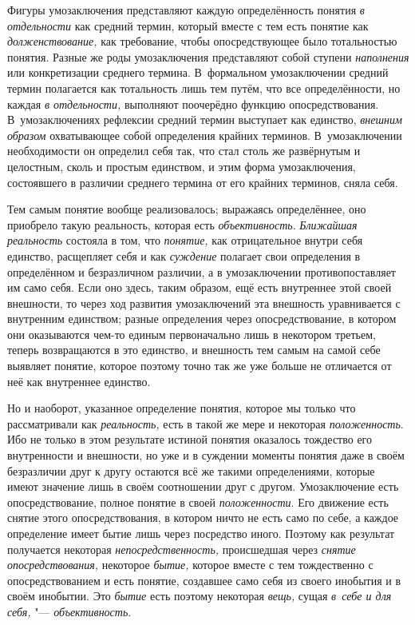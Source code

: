 Фигуры умозаключения представляют каждую определённость
понятия {\em в отдельности}
как средний термин, который вместе с тем есть понятие как
{\em долженствование,}
как требование, чтобы опосредствующее было тотальностью
понятия. Разные же роды умозаключения представляют собой ступени
{\em наполнения} или
конкретизации среднего термина. В~формальном умозаключении средний термин
полагается как тотальность лишь тем путём, что все определённости, но
каждая {\em в отдельности,}
выполняют поочерёдно функцию опосредствования.
В~умозаключениях рефлексии средний термин выступает как единство,
{\em внешним образом} охватывающее собой определения крайних терминов.
В~умозаключении необходимости он определил себя так, что стал столь же
развёрнутым и целостным, сколь и простым единством, и этим форма
умозаключения, состоявшего в различии среднего термина от его крайних
терминов, сняла себя.

Тем самым понятие вообще реализовалось; выражаясь
определённее, оно приобрело такую реальность, которая есть
{\em объективность}. {\em Ближайшая реальность} состояла в том, что
{\em понятие,} как отрицательное внутри себя единство, расщепляет себя и как
{\em суждение} полагает
свои определения в определённом и безразличном различии, а в умозаключении
противопоставляет им само себя. Если оно здесь, таким образом, ещё есть
внутреннее этой своей внешности, то через ход развития умозаключений эта
внешность уравнивается с внутренним единством; разные определения через
опосредствование, в котором они оказываются чем-то единым первоначально
лишь в некотором третьем, теперь возвращаются в это единство, и внешность
тем самым на самой себе выявляет понятие, которое поэтому точно так же уже
больше не отличается от неё как внутреннее единство.

Но и наоборот, указанное определение понятия, которое мы
только что рассматривали как {\em реальность,} есть в
такой же мере и некоторая {\em положенность}. Ибо
не только в этом результате истиной понятия оказалось тождество его
внутренности и внешности, но уже и в суждении моменты понятия даже в своём
безразличии друг к другу остаются всё же такими определениями, которые
имеют значение лишь в своём соотношении друг с другом. Умозаключение есть
опосредствование, полное понятие в своей {\em положенности}. Его
движение есть снятие этого опосредствования, в котором ничто не есть само
по себе, а каждое определение имеет бытие лишь через посредство иного.
Поэтому как результат получается некоторая {\em непосредственность,}
происшедшая через {\em снятие опосредствования,} некоторое {\em бытие,}
которое вместе с тем тождественно с опосредствованием и есть
понятие, создавшее само себя из своего инобытия и в своём инобытии. Это
{\em бытие} есть поэтому некоторая {\em вещь,} сущая {\em в~себе и для
себя,} "--- {\em объективность}.


